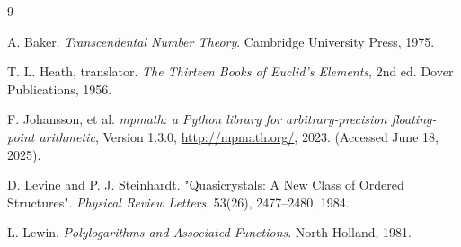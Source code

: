 \documentclass{amsart}
\theoremstyle{plain}
\theoremstyle{definition}
\theoremstyle{remark}
\begin{document}
\begin{thebibliography}{9}

A. Baker. \textit{Transcendental Number Theory}. Cambridge University Press, 1975. 

T. L. Heath, translator. \textit{The Thirteen Books of Euclid's Elements}, 2nd ed. Dover Publications, 1956. 

F. Johansson, et al. \textit{mpmath: a Python library for arbitrary-precision floating-point arithmetic}, Version 1.3.0, \url{http://mpmath.org/}, 2023. (Accessed June 18, 2025).

D. Levine and P. J. Steinhardt. "Quasicrystals: A New Class of Ordered Structures". \textit{Physical Review Letters}, 53(26), 2477--2480, 1984.

L. Lewin. \textit{Polylogarithms and Associated Functions}. North-Holland, 1981. 

\end{thebibliography}
\end{document}
